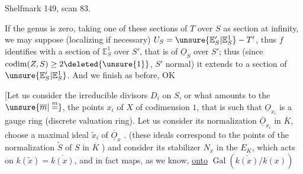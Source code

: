Shelfmark 149, scan 83.

If the genus is zero, taking one of these sections of $T$ over $S$ as section at infinity, we may suppose (localizing if necessary) $U_S=\unsure{\mathbb E'_S|\mathbb E^1_S}-T'$, thus $f$ identifies with a section of $\mathbb E^1_S$ over $S'$, that is of $\underline O_S$ over $S'$; thus (since $\operatorname{codim}(Z,S)\geq2\deleted{\unsure{1}}$, $S'$ normal) it extends to a section of $\unsure{\mathbb E'_S|\mathbb E^1_S}$. And we finish as before, OK

[Let us consider  the irreducible divisors $D_i$ on $S$, or what amounts to the $\unsure{\overline m|\overset{m}{=}}$, the points $x_i$ of $X$ of codimension $1$, that is such that $\underline O_{x_i}$ is a gauge ring (discrete valuation ring). Let us consider its normalization $\overline{\underline O}_{x_i}$ in $\overline K$, choose a maximal ideal $\widetilde x_i$ of $\overline{\underline O}_x$ . (these ideals correspond to the points of the normalization $\widetilde S$ of $S$ in $\overline K$ ) and consider its stabilizer $N_x$ in the $E_K$, which acts  on $k(\widetilde x)=\overline{k(x)}$, and in fact maps, as we know, \uline{onto} $\operatorname{Gal}(\overline{k(x)}/k(x))$
